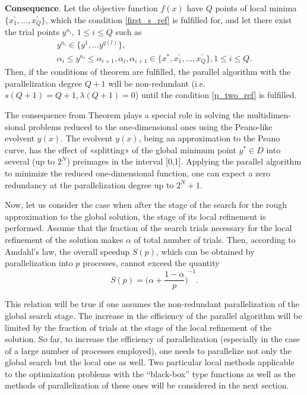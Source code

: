 \documentclass[runningheads]{llncs}
\begin{document}
\textbf{Consequence}. Let the objective function $f(x)$ have $Q$ points of local minima $\{x_1^{\prime},...,x_Q^{\prime}\}$, which the condition \eqref{first_s_ref} is fulfilled for, and let there exist the trial points $y^{n_i}$, $1 \leq i \leq Q$ such as 
\begin{gather} 
    y^{n_i} \in \{y^1,...y^{q(l)}\}, \label{conseq_range_ref} \\ 
    \alpha_i \leq y^{n_i} \leq \alpha_{i+1}, \alpha_i, \alpha_{i+1} \in \{x^*, x_1^{\prime},...,x_Q^{\prime}\}, 1 \leq i \leq Q. \label{conseq_ref}
\end{gather}
Then, if the conditions of theorem are fulfilled, the parallel algorithm with the parallelization degree $Q+1$ will be non-redundant (i.e. $s(Q+1)=Q+1, \lambda(Q+1)=0$) until the condition \eqref{p_two_ref} is fulfilled.

The consequence from Theorem plays a special role in solving the multidimen-sional problems reduced to the one-dimensional ones using the Peano-like evolvent $y(x)$. The evolvent $y(x)$, being an approximation to the Peano curve, has the effect of «splitting» of the global minimum point $y^* \in D$ into several (up to $2^N$) preimages in the interval [0,1]. Applying the parallel algorithm to minimize the reduced one-dimensional function, one can expect a zero redundancy at the parallelization degree up to $2^N+1$.

Now, let us consider the case when after the stage of the search for the rough approximation to the global solution, the stage of its local refinement is performed. Assume that the fraction of the search trials necessary for the local refinement of the solution makes $\alpha$ of total number of trials. Then, according to Amdahl's law, the overall speedup $S(p)$, which can be obtained by parallelization into $p$ processes, cannot exceed the quantity 
$$ S(p) = {\Big(\alpha + \frac{1-\alpha}{p}\Big)}^{-1}.$$

This relation will be true if one assumes the non-redundant parallelization of the global search stage. The increase in the efficiency of the parallel algorithm will be limited by the fraction of trials at the stage of the local refinement of the solution. So far, to increase the efficiency of parallelization (especially in the case of a large number of processes employed), one needs to parallelize not only the global search but the local one as well. Two particular local methods applicable to the optimization problems with the ``black-box'' type functions as well as the methods of parallelization of these ones will be considered in the next section.
\end{document}
